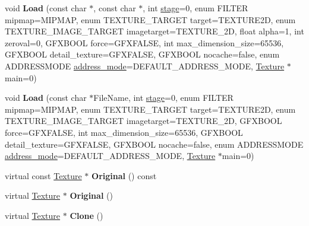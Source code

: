 \begin{DoxyCompactItemize}
\item 
void {\bfseries Load} (const char $\ast$, const char $\ast$, int \hyperlink{classTexture_aa38999434f9fcf409ca20b4523852b7b}{stage}=0, enum F\+I\+L\+T\+ER mipmap=M\+I\+P\+M\+AP, enum T\+E\+X\+T\+U\+R\+E\+\_\+\+T\+A\+R\+G\+ET target=T\+E\+X\+T\+U\+R\+E2D, enum T\+E\+X\+T\+U\+R\+E\+\_\+\+I\+M\+A\+G\+E\+\_\+\+T\+A\+R\+G\+ET imagetarget=T\+E\+X\+T\+U\+R\+E\+\_\+2D, float alpha=1, int zeroval=0, G\+F\+X\+B\+O\+OL force=G\+F\+X\+F\+A\+L\+SE, int max\+\_\+dimension\+\_\+size=65536, G\+F\+X\+B\+O\+OL detail\+\_\+texture=G\+F\+X\+F\+A\+L\+SE, G\+F\+X\+B\+O\+OL nocache=false, enum A\+D\+D\+R\+E\+S\+S\+M\+O\+DE \hyperlink{classTexture_af3605a5ea18f32b7669cf0db94b12fe6}{address\+\_\+mode}=D\+E\+F\+A\+U\+L\+T\+\_\+\+A\+D\+D\+R\+E\+S\+S\+\_\+\+M\+O\+DE, \hyperlink{classTexture}{Texture} $\ast$main=0)\hypertarget{classTexture_a9fedcad630f2aa5e5f629759447728aa}{}\label{classTexture_a9fedcad630f2aa5e5f629759447728aa}

\item 
void {\bfseries Load} (const char $\ast$File\+Name, int \hyperlink{classTexture_aa38999434f9fcf409ca20b4523852b7b}{stage}=0, enum F\+I\+L\+T\+ER mipmap=M\+I\+P\+M\+AP, enum T\+E\+X\+T\+U\+R\+E\+\_\+\+T\+A\+R\+G\+ET target=T\+E\+X\+T\+U\+R\+E2D, enum T\+E\+X\+T\+U\+R\+E\+\_\+\+I\+M\+A\+G\+E\+\_\+\+T\+A\+R\+G\+ET imagetarget=T\+E\+X\+T\+U\+R\+E\+\_\+2D, G\+F\+X\+B\+O\+OL force=G\+F\+X\+F\+A\+L\+SE, int max\+\_\+dimension\+\_\+size=65536, G\+F\+X\+B\+O\+OL detail\+\_\+texture=G\+F\+X\+F\+A\+L\+SE, G\+F\+X\+B\+O\+OL nocache=false, enum A\+D\+D\+R\+E\+S\+S\+M\+O\+DE \hyperlink{classTexture_af3605a5ea18f32b7669cf0db94b12fe6}{address\+\_\+mode}=D\+E\+F\+A\+U\+L\+T\+\_\+\+A\+D\+D\+R\+E\+S\+S\+\_\+\+M\+O\+DE, \hyperlink{classTexture}{Texture} $\ast$main=0)\hypertarget{classTexture_abb770d07e43571cb3356e2be331ad41b}{}\label{classTexture_abb770d07e43571cb3356e2be331ad41b}

\item 
virtual const \hyperlink{classTexture}{Texture} $\ast$ {\bfseries Original} () const \hypertarget{classTexture_a36e363bd778ddff0e7085eb9ab8ee60a}{}\label{classTexture_a36e363bd778ddff0e7085eb9ab8ee60a}

\item 
virtual \hyperlink{classTexture}{Texture} $\ast$ {\bfseries Original} ()\hypertarget{classTexture_a758598c87efbf7233145349247963d57}{}\label{classTexture_a758598c87efbf7233145349247963d57}

\item 
virtual \hyperlink{classTexture}{Texture} $\ast$ {\bfseries Clone} ()\hypertarget{classTexture_a15a4db24b3483becd6a69bae7a59a812}{}\label{classTexture_a15a4db24b3483becd6a69bae7a59a812}


\end{DoxyCompactItemize}
